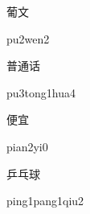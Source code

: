\begin{multicols*}{2}
\begin{verbete}[pu2wen2]{葡文}
\begin{pronuncia}{pu2wen2}
\end{pronuncia}
\end{verbete}

\begin{verbete}{普通话}
\begin{pronuncia}{pu3tong1hua4}
\end{pronuncia}
\end{verbete}

\begin{verbete}[pian2yi0]{便宜}
\begin{pronuncia}{pian2yi0}
\end{pronuncia}
\end{verbete}

\begin{verbete}{乒乓球}
\begin{pronuncia}{ping1pang1qiu2}
\end{pronuncia}
\end{verbete}

\end{multicols*}
